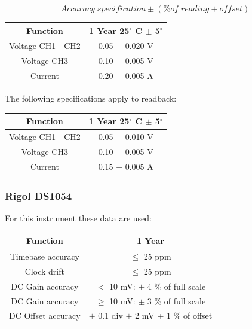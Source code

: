 \documentclass[../main.tex]{subfiles}
\begin{document}
\[ \unit{Accuracy \; specification} \pm (\% \unit{of \; reading} + \unit{offset} )\]

\begin{center}
\begin{tabular}{c  c}
\textbf{Function} & \textbf{1 Year 25$^\circ$ C $\pm$ 5$^\circ$} \\
\hline
Voltage CH1 - CH2 &  0.05 + 0.020 V  \\
\hline
Voltage CH3  &  0.10 + 0.005 V  \\
\hline
Current & 0.20 + 0.005 A \\

\end{tabular}
\end{center}

The following specifications apply to readback:

\begin{center}
\begin{tabular}{c  c}
\textbf{Function} & \textbf{1 Year 25$^\circ$ C $\pm$ 5$^\circ$} \\
\hline
Voltage CH1 - CH2 &  0.05 + 0.010 V  \\
\hline
Voltage CH3  &  0.10 + 0.005 V \\
\hline
Current & 0.15 + 0.005 A \\
\end{tabular}
\end{center}

\subsubsection*{Rigol DS1054}

For this instrument these data are used:

\begin{center}
\begin{tabular}{c  c}
\textbf{Function} & \textbf{1 Year} \\
\hline
Timebase accuracy &  $\leq$ 25 ppm \\
\hline
Clock drift & $\leq$ 25 ppm \\
\hline
DC Gain accuracy & $<$ 10 mV: $\pm$ 4 \% of full scale  \\
\hline
DC Gain accuracy & $\geq$ 10 mV: $\pm$ 3 \% of full scale  \\
\hline
DC Offset accuracy & $\pm$ 0.1 div $\pm$ 2 mV + 1 \% of offset  \\
\end{tabular}
\end{center}
\end{document}
